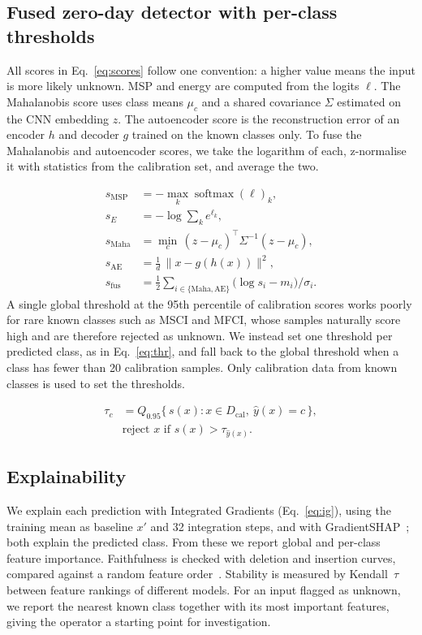 \documentclass[10pt,twocolumn,letterpaper]{article}
\begin{document}
\subsection{Fused zero-day detector with per-class thresholds}
All scores in Eq.~\eqref{eq:scores} follow one convention: a higher value
means the input is more likely unknown. MSP and energy are computed from
the logits $\ell$. The Mahalanobis score uses class means $\mu_c$ and a
shared covariance $\Sigma$ estimated on the CNN embedding $z$. The
autoencoder score is the reconstruction error of an encoder $h$ and
decoder $g$ trained on the known classes only. To fuse the Mahalanobis and
autoencoder scores, we take the logarithm of each, z-normalise it with
statistics from the calibration set, and average the two.

\begin{equation}\label{eq:scores}
\begin{aligned}
s_{\mathrm{MSP}} &= -\max_k \operatorname{softmax}(\ell)_k,\\
s_{E} &= -\log \textstyle\sum_k e^{\ell_k},\\
s_{\mathrm{Maha}} &= \min_c\, (z-\mu_c)^{\top}\Sigma^{-1}(z-\mu_c),\\
s_{\mathrm{AE}} &= \tfrac{1}{d}\,\lVert x - g(h(x)) \rVert^2,\\
s_{\mathrm{fus}} &= \tfrac{1}{2}\textstyle\sum_{i\in\{\mathrm{Maha},\mathrm{AE}\}} \big(\log s_i - m_i\big)/\sigma_i .
\end{aligned}
\end{equation}
A single global threshold at the 95th percentile of calibration scores
works poorly for rare known classes such as MSCI and MFCI, whose samples
naturally score high and are therefore rejected as unknown. We instead
set one threshold per predicted class, as in Eq.~\eqref{eq:thr}, and fall
back to the global threshold when a class has fewer than 20 calibration
samples. Only calibration data from known classes is used to set the
thresholds.

\begin{equation}\label{eq:thr}
\begin{aligned}
\tau_c &= Q_{0.95}\{\, s(x) : x \in D_{\mathrm{cal}},\ \hat{y}(x) = c \,\},\\
&\text{reject } x \text{ if } s(x) > \tau_{\hat{y}(x)} .
\end{aligned}
\end{equation}
\subsection{Explainability}
We explain each prediction with Integrated Gradients
(Eq.~\eqref{eq:ig}), using the training mean as baseline $x'$ and 32
integration steps, and with GradientSHAP~\cite{lundberg2017shap}; both
explain the predicted class. From these we report global and per-class
feature importance. Faithfulness is checked with deletion and insertion
curves, compared against a random feature order~\cite{petsiuk2018rise}.
Stability is measured by Kendall~$\tau$ between feature rankings of
different models. For an input flagged as unknown, we report the nearest
known class together with its most important features, giving the operator
a starting point for investigation.
\end{document}
